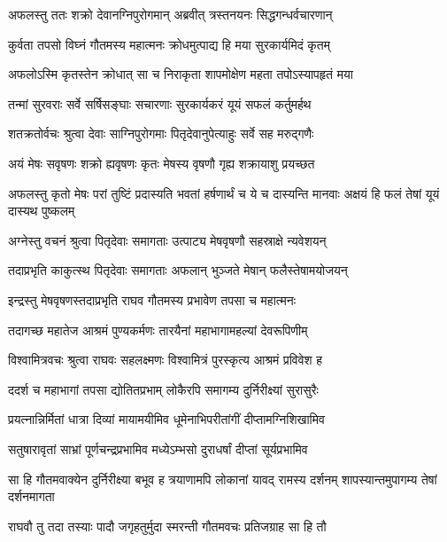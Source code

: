 
\twolineshloka
{अफलस्तु ततः शक्रो देवानग्निपुरोगमान्}
{अब्रवीत् त्रस्तनयनः सिद्धगन्धर्वचारणान्} %

\twolineshloka
{कुर्वता तपसो विघ्नं गौतमस्य महात्मनः}
{क्रोधमुत्पाद्य हि मया सुरकार्यमिदं कृतम्} %

\twolineshloka
{अफलोऽस्मि कृतस्तेन क्रोधात् सा च निराकृता}
{शापमोक्षेण महता तपोऽस्यापहृतं मया} %

\twolineshloka
{तन्मां सुरवराः सर्वे सर्षिसङ्घाः सचारणाः}
{सुरकार्यकरं यूयं सफलं कर्तुमर्हथ} %

\twolineshloka
{शतक्रतोर्वचः श्रुत्वा देवाः साग्निपुरोगमाः}
{पितृदेवानुपेत्याहुः सर्वे सह मरुद्गणैः} %

\twolineshloka
{अयं मेषः सवृषणः शक्रो ह्यवृषणः कृतः}
{मेषस्य वृषणौ गृह्य शक्रायाशु प्रयच्छत} %

\threelineshloka
{अफलस्तु कृतो मेषः परां तुष्टिं प्रदास्यति}
{भवतां हर्षणार्थं च ये च दास्यन्ति मानवाः}
{अक्षयं हि फलं तेषां यूयं दास्यथ पुष्कलम्} %

\twolineshloka
{अग्नेस्तु वचनं श्रुत्वा पितृदेवाः समागताः}
{उत्पाट्य मेषवृषणौ सहस्राक्षे न्यवेशयन्} %

\twolineshloka
{तदाप्रभृति काकुत्स्थ पितृदेवाः समागताः}
{अफलान् भुञ्जते मेषान् फलैस्तेषामयोजयन्} %

\twolineshloka
{इन्द्रस्तु मेषवृषणस्तदाप्रभृति राघव}
{गौतमस्य प्रभावेण तपसा च महात्मनः} %

\twolineshloka
{तदागच्छ महातेज आश्रमं पुण्यकर्मणः}
{तारयैनां महाभागामहल्यां देवरूपिणीम्} %

\twolineshloka
{विश्वामित्रवचः श्रुत्वा राघवः सहलक्ष्मणः}
{विश्वामित्रं पुरस्कृत्य आश्रमं प्रविवेश ह} %

\twolineshloka
{ददर्श च महाभागां तपसा द्योतितप्रभाम्}
{लोकैरपि समागम्य दुर्निरीक्ष्यां सुरासुरैः} %

\twolineshloka
{प्रयत्नान्निर्मितां धात्रा दिव्यां मायामयीमिव}
{धूमेनाभिपरीतांगीं दीप्तामग्निशिखामिव} %

\twolineshloka
{सतुषारावृतां साभ्रां पूर्णचन्द्रप्रभामिव}
{मध्येऽम्भसो दुराधर्षां दीप्तां सूर्यप्रभामिव} %

\threelineshloka
{सा हि गौतमवाक्येन दुर्निरीक्ष्या बभूव ह}
{त्रयाणामपि लोकानां यावद् रामस्य दर्शनम्}
{शापस्यान्तमुपागम्य तेषां दर्शनमागता} %

\twolineshloka
{राघवौ तु तदा तस्याः पादौ जगृहतुर्मुदा}
{स्मरन्ती गौतमवचः प्रतिजग्राह सा हि तौ} %

